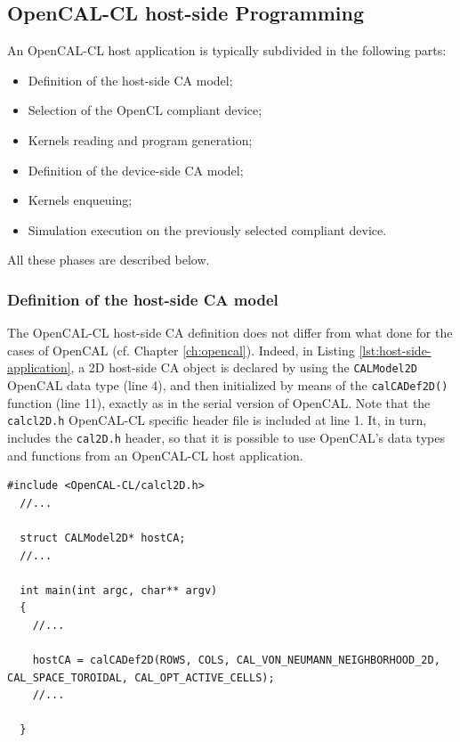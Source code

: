 \subsection{OpenCAL-CL host-side Programming}

An OpenCAL-CL host application is typically
subdivided in the following parts:
\begin{itemize}
\item Definition of the host-side CA model;
\item Selection of the OpenCL compliant device;
\item Kernels reading and program generation;
\item Definition of the device-side CA model;
\item Kernels enqueuing;
\item Simulation execution on the previously selected compliant
  device.
\end{itemize}

All these phases are described below.

\subsubsection{Definition of the host-side CA model}

The OpenCAL-CL host-side CA definition does not differ from what done
for the cases of OpenCAL (cf. Chapter \ref{ch:opencal}). Indeed, in
Listing \ref{lst:host-side-application}, a 2D host-side CA object is
declared by using the \verb'CALModel2D' OpenCAL data type (line 4),
and then initialized by means of the \verb'calCADef2D()' function
(line 11), exactly as in the serial version of OpenCAL. Note that the
\verb'calcl2D.h' OpenCAL-CL specific header file is included at line
1. It, in turn, includes the \verb'cal2D.h' header, so that it is
possible to use OpenCAL's data types and functions from an OpenCAL-CL
host application.

\begin{lstlisting}[float,floatplacement=H, label=lst:host-side-application, caption={An example of OpenCAL-CL host-side application.}] 
  #include <OpenCAL-CL/calcl2D.h>
  //...

  struct CALModel2D* hostCA;
  //...
  
  int main(int argc, char** argv)
  {
    //...

    hostCA = calCADef2D(ROWS, COLS, CAL_VON_NEUMANN_NEIGHBORHOOD_2D, CAL_SPACE_TOROIDAL, CAL_OPT_ACTIVE_CELLS);
    //...
        
  }
\end{lstlisting}


